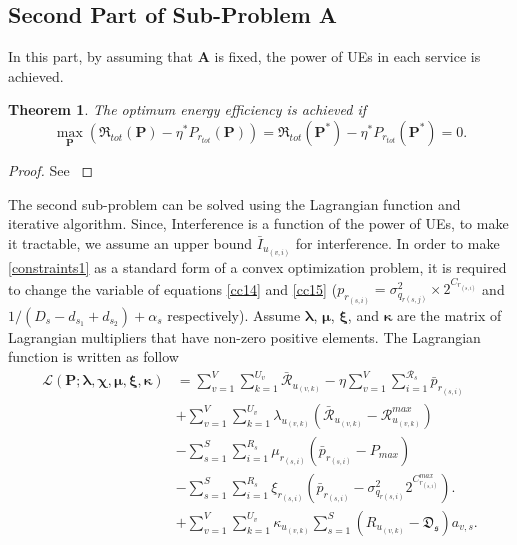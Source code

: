 \documentclass[conference]{IEEEtran}
\newtheorem{theorem}{Theorem}
\begin{document}
\subsection{Second Part of Sub-Problem A}\label{secondsub}
In this part, by assuming that $\boldsymbol{A}$ is fixed, the power of UEs in each service is achieved.
\begin{theorem}\label{t2}
The optimum energy efficiency is achieved if
\begin{equation}\label{q2}
\max \limits_{\boldsymbol{P}} (\mathfrak{R}_{tot}(\boldsymbol{P}) - \eta^* P_{r_{tot}}(\boldsymbol{P}))=
 \mathfrak{R}_{tot}(\boldsymbol{P}^*) - \eta^* P_{r_{tot}}(\boldsymbol{P}^*) =0.
\end{equation}
\end{theorem}
\begin{proof}
See \cite[Appendix A]{aaa}
\end{proof}
The second sub-problem can  be solved using the Lagrangian function and iterative algorithm.
Since, Interference is a function of the power of UEs, to make it tractable, we assume an upper bound $\bar{I}_{u_{(v,i)}}$ for interference. In order to make \eqref{constraints1} as a standard form of a convex optimization problem, it is required to change the variable of equations \eqref{cc14} and \eqref{cc15} ($p_{r_{(s,i)}} = \sigma_{q_{r(s,j)}}^2\times 2^{C_{r_{(s,i)}}}$ and $1/(D_{s}- d_{s_1} + d_{s_2})+\alpha_s$ respectively).
Assume $\boldsymbol{\lambda}$, $\boldsymbol{\mu}$, $\boldsymbol{\xi}$, and $\boldsymbol{ \kappa}$ are the matrix of Lagrangian multipliers that have non-zero positive elements.
The Lagrangian function is written as follow
\begin{subequations}\label{lagrang}
\begin{alignat}{4}
\mathcal{L}(\boldsymbol{P}; \boldsymbol{\lambda}, \boldsymbol{\chi}, \boldsymbol{\mu}, \boldsymbol{ \xi}, \boldsymbol{ \kappa}) & = \sum\limits_{v=1}^{V} \sum\limits_{k=1}^{U_v}\mathcal{\bar{R}}_{u_{(v,k)}}
- \eta \sum\limits_{v=1}^{V} \sum\limits_{i=1}^{\mathcal{R}_s}\bar{p}_{r_{(s,i)}}\\
&+\sum\limits_{v=1}^{V} \sum\limits_{k=1}^{U_v} \lambda_{u_{(v,k)}} (\mathcal{\bar{R}}_{u_{(v,k)}}-\mathcal{R}_{u_{(v,k)}}^{max})\\
&- \sum\limits_{s=1}^{S} \sum\limits_{i=1}^{R_s} \mu_{r_{(s,i)}} (\bar{p}_{r_{(s,i)}}-P_{max})\\
&- \sum\limits_{s=1}^{S} \sum\limits_{i=1}^{R_s} \xi_{r_{(s,i)}} (\bar{p}_{r_{(s,i)}}-\sigma_{q_{r(s,i)}}^2 2^{C_{r_{(s,i)}}^{max}}).\\
&+ \sum\limits_{v=1}^{V} \sum\limits_{k=1}^{U_v} \kappa_{u_{(v,k)}} \sum\limits_{s=1}^{S}(R_{u_{(v,k)}} -\mathfrak{D_s})a_{v,s}.
\end{alignat}
\end{subequations}
\end{document}
